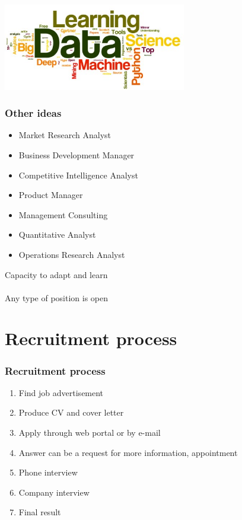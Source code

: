 \documentclass[]{beamer}
\begin{document}
\begin{frame}
\centering
\includegraphics[width=0.6\textwidth]{datascience}

\end{frame}

\begin{frame}
\frametitle{Other ideas}
\begin{itemize}
\item Market Research Analyst
\item Business Development Manager
\item Competitive Intelligence Analyst
\item Product Manager
\item Management Consulting
\item Quantitative Analyst
\item Operations Research Analyst
\end{itemize}
\end{frame}

\begin{frame}
\centering
\alert{Capacity to adapt and learn}\\~\\ Any type of position is open

\end{frame}

\section{Recruitment process}
\begin{frame}
\frametitle{Recruitment process}
\begin{enumerate}
\item Find job advertisement
\item Produce CV and cover letter
\item Apply through web portal or by e-mail
\item Answer can be a request for more information, appointment
\item Phone interview
\item Company interview
\item Final result
\end{enumerate}
\end{frame}
\end{document}
